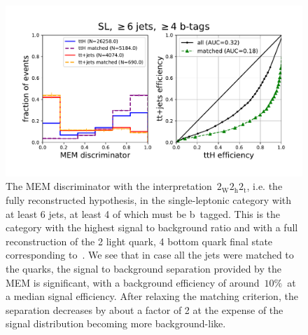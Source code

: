 \begin{figure}
\begin{centering}
\includegraphics[width = 1.0\textwidth]{figures/mem_sl_jge6_tge4.pdf}
\caption{The MEM discriminator with the interpretation~$2_{\mathrm{W}} 2_{\mathrm{h}} 2_{\mathrm{t}}$, i.e. the fully reconstructed hypothesis, in the single-leptonic category with at least 6 jets, at least 4 of which must be b~tagged. This is the category with the highest signal to background ratio and with a full reconstruction of the 2 light quark, 4 bottom quark final state corresponding to~\ttHbb. We see that in case all the jets were matched to the quarks, the signal to background separation provided by the MEM is significant, with a background efficiency of around~$10\%$~at a median signal efficiency. After relaxing the matching criterion, the separation decreases by about a factor of 2 at the expense of the signal distribution becoming more background-like.}
\label{fig:mem_sl_jge6_tge4}
\end{centering}
\end{figure}

